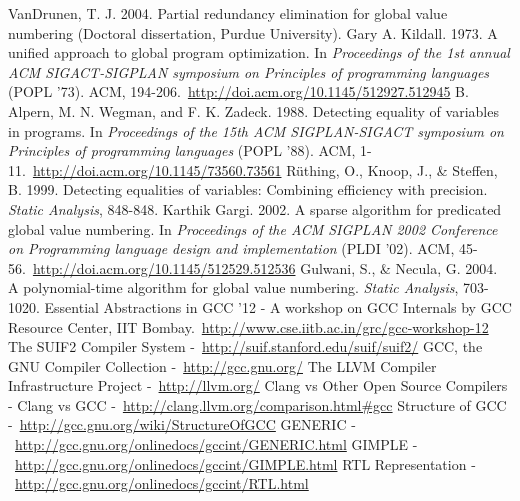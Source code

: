 \cleardoublepage
{}
{}
\begin{thebibliography}{99}

VanDrunen, T. J. 2004. Partial redundancy elimination for global value numbering (Doctoral dissertation, Purdue University).
Gary A. Kildall. 1973. A unified approach to global program optimization. In \emph{Proceedings of the 1st annual ACM SIGACT-SIGPLAN symposium on Principles of programming languages} (POPL '73). ACM, 194-206.\ \url{http://doi.acm.org/10.1145/512927.512945}
B. Alpern, M. N. Wegman, and F. K. Zadeck. 1988. Detecting equality of variables in programs. In \emph{Proceedings of the 15th ACM SIGPLAN-SIGACT symposium on Principles of programming languages} (POPL '88). ACM, 1-11.\ \url{http://doi.acm.org/10.1145/73560.73561}
R\"uthing, O., Knoop, J., \& Steffen, B. 1999. Detecting equalities of variables: Combining efficiency with precision. \emph{Static Analysis}, 848-848.
Karthik Gargi. 2002. A sparse algorithm for predicated global value numbering. In \emph{Proceedings of the ACM SIGPLAN 2002 Conference on Programming language design and implementation} (PLDI '02). ACM, 45-56.\ \url{http://doi.acm.org/10.1145/512529.512536}
Gulwani, S., \& Necula, G. 2004. A polynomial-time algorithm for global value numbering. \emph{Static Analysis}, 703-1020.
Essential Abstractions in GCC '12 - A workshop on GCC Internals by GCC Resource Center, IIT Bombay.\ \url{http://www.cse.iitb.ac.in/grc/gcc-workshop-12}
The SUIF2 Compiler System -\ \url{http://suif.stanford.edu/suif/suif2/}
GCC, the GNU Compiler Collection -\ \url{http://gcc.gnu.org/}
The LLVM Compiler Infrastructure Project -\ \url{http://llvm.org/}
Clang vs Other Open Source Compilers - Clang vs GCC -\ \url{http://clang.llvm.org/comparison.html#gcc}
Structure of GCC -\ \url{http://gcc.gnu.org/wiki/StructureOfGCC}
GENERIC -\ \url{http://gcc.gnu.org/onlinedocs/gccint/GENERIC.html}
GIMPLE -\ \url{http://gcc.gnu.org/onlinedocs/gccint/GIMPLE.html}
RTL Representation -\ \url{http://gcc.gnu.org/onlinedocs/gccint/RTL.html}

\end{thebibliography}
